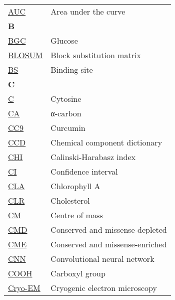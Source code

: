 \begin{longtable}[l]{@{}p{2.5cm}p{12cm}@{}}
\textmd{\href{https://en.wikipedia.org/wiki/Receiver_operating_characteristic}{AUC}} & Area under the curve \\[0.3175cm]
\textbf{\large B} & \\[0.25cm]
\textmd{\href{https://www.ebi.ac.uk/pdbe-srv/pdbechem/chemicalCompound/show/BGC}{BGC}} & Glucose \\
\textmd{\href{https://en.wikipedia.org/wiki/BLOSUM}{BLOSUM}} & Block substitution matrix \\
\textmd{\href{https://en.wikipedia.org/wiki/Binding_site}{BS}} & Binding site \\[0.3175cm]
\textbf{\large C} & \\[0.25cm]
\textmd{\href{https://en.wikipedia.org/wiki/Cytosine}{C}} & Cytosine \\
\textmd{\href{https://en.wikipedia.org/wiki/Amino_acid\#Chirality}{CA}} & α-carbon \\
\textmd{\href{https://www.ebi.ac.uk/pdbe-srv/pdbechem/chemicalCompound/show/CC9}{CC9}} & Curcumin \\
\textmd{\href{https://www.wwpdb.org/data/ccd}{CCD}} & Chemical component dictionary \\
\textmd{\href{https://en.wikipedia.org/wiki/Calinski–Harabasz_index}{CHI}} & Calinski-Harabasz index \\
\textmd{\href{https://en.wikipedia.org/wiki/Confidence_interval}{CI}} & Confidence interval \\
\textmd{\href{https://www.ebi.ac.uk/pdbe-srv/pdbechem/chemicalCompound/show/CLA}{CLA}} & Chlorophyll A \\
\textmd{\href{https://www.ebi.ac.uk/pdbe-srv/pdbechem/chemicalCompound/show/CLR}{CLR}} & Cholesterol \\
\textmd{\href{https://en.wikipedia.org/wiki/Center_of_mass}{CM}} & Centre of mass \\
\textmd{\href{https://www.nature.com/articles/s42003-024-06117-5}{CMD}} & Conserved and missense-depleted \\
\textmd{\href{https://www.nature.com/articles/s42003-024-06117-5}{CME}} & Conserved and missense-enriched \\
\textmd{\href{https://en.wikipedia.org/wiki/Convolutional_neural_network}{CNN}} & Convolutional neural network \\
\textmd{\href{https://en.wikipedia.org/wiki/Carboxylic_acid}{COOH}} & Carboxyl group \\
\textmd{\href{https://en.wikipedia.org/wiki/Cryogenic_electron_microscopy}{Cryo-EM}} & Cryogenic electron microscopy \\[0.3175cm]

\end{longtable}
